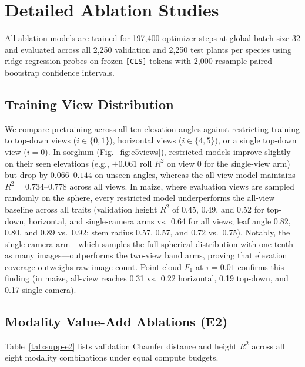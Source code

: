 \documentclass[10pt,twocolumn,letterpaper]{article}
\begin{document}
\section{Detailed Ablation Studies}
\label{app:ablations}

All ablation models are trained for 197{,}400 optimizer steps at global batch size 32 and evaluated across all 2{,}250 validation and 2{,}250 test plants per species using ridge regression probes on frozen \texttt{[CLS]} tokens with 2{,}000-resample paired bootstrap confidence intervals.

\subsection{Training View Distribution}
\label{app:views-full}

We compare pretraining across all ten elevation angles against restricting training to top-down views ($i \in \{0,1\}$), horizontal views ($i \in \{4,5\}$), or a single top-down view ($i = 0$). In sorghum (Fig.~\ref{fig:e5views}), restricted models improve slightly on their seen elevations (e.g., $+0.061$ roll $R^2$ on view 0 for the single-view arm) but drop by $0.066\text{--}0.144$ on unseen angles, whereas the all-view model maintains $R^2 = 0.734\text{--}0.778$ across all views. In maize, where evaluation views are sampled randomly on the sphere, every restricted model underperforms the all-view baseline across all traits (validation height $R^2$ of 0.45, 0.49, and 0.52 for top-down, horizontal, and single-camera arms vs.\ 0.64 for all views; leaf angle 0.82, 0.80, and 0.89 vs.\ 0.92; stem radius 0.57, 0.57, and 0.72 vs.\ 0.75). Notably, the single-camera arm---which samples the full spherical distribution with one-tenth as many images---outperforms the two-view band arms, proving that elevation coverage outweighs raw image count. Point-cloud $F_1$ at $\tau = 0.01$ confirms this finding (in maize, all-view reaches 0.31 vs.\ 0.22 horizontal, 0.19 top-down, and 0.17 single-camera).

\subsection{Modality Value-Add Ablations (E2)}
Table~\ref{tab:supp-e2} lists validation Chamfer distance and height $R^2$ across all eight modality combinations under equal compute budgets.
\end{document}
